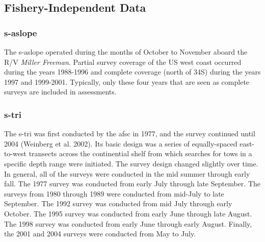 \documentclass[11pt,
  english,
  a4paper,
]{article}
\begin{document}
\leavevmode\tagmcend\tagstructend


\hypertarget{fishery-independent-data}{%
\subsection{Fishery-Independent Data}\label{fishery-independent-data}}

\leavevmode\tagmcend\tagstructend


\hypertarget{section}{%
\subsubsection{\texorpdfstring{\acrlong{s-aslope}}{}}\label{section}}

\leavevmode\tagmcend\tagstructend


The \gls{s-aslope} operated during the months of October to November aboard the R/V \emph{Miller Freeman}. Partial survey coverage of the US west coast occurred during the years 1988-1996 and complete coverage (north of 34\textquotesingle S) during the years 1997 and 1999-2001. Typically, only these four years that are seen as complete surveys are included in assessments.

\leavevmode\tagmcend\tagstructend\par


\hypertarget{section-1}{%
\subsubsection{\texorpdfstring{\acrlong{s-tri}}{}}\label{section-1}}

\leavevmode\tagmcend\tagstructend


The \gls{s-tri} was first conducted by the \gls{afsc} in 1977, and the survey continued until 2004 {(Weinberg et al. 2002)\leavevmode\tagmcend\tagstructend}. Its basic design was a series of equally-spaced east-to-west transects across the continential shelf from which searches for tows in a specific depth range were initiated. The survey design changed slightly over time. In general, all of the surveys were conducted in the mid summer through early fall. The 1977 survey was conducted from early July through late September. The surveys from 1980 through 1989 were conducted from mid-July to late September. The 1992 survey was conducted from mid July through early October. The 1995 survey was conducted from early June through late August. The 1998 survey was conducted from early June through early August. Finally, the 2001 and 2004 surveys were conducted from May to July.
\end{document}
